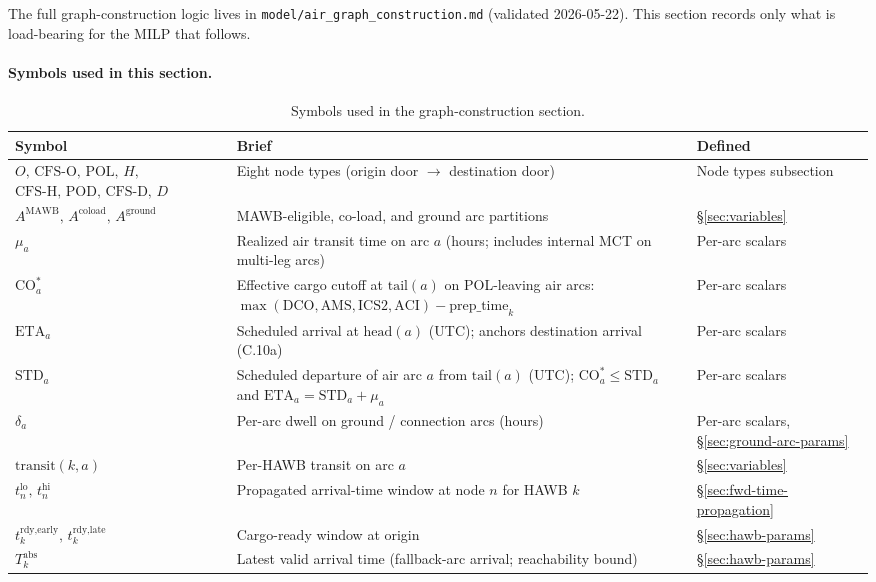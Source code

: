 \documentclass[11pt,a4paper]{article}
\theoremstyle{definition}
\begin{document}
The full graph-construction logic lives in
\texttt{model/air\_graph\_construction.md} (validated 2026-05-22). This section
records only what is load-bearing for the MILP that follows.

\paragraph{Symbols used in this section.}
\begin{table}[H]
\centering
\caption{Symbols used in the graph-construction section.}
\label{tab:graph-construction-syms}
\begin{tabular}{p{4.2cm}p{7.5cm}p{3cm}}
\toprule
Symbol & Brief & Defined \\
\midrule
$O,\, \text{CFS-O},\, \text{POL},\, H,$ $\text{CFS-H},\, \text{POD},\, \text{CFS-D},\, D$ & Eight node types (origin door $\to$ destination door) & Node types subsection \\
$A^{\text{MAWB}},\, A^{\text{coload}},\, A^{\text{ground}}$ & MAWB-eligible, co-load, and ground arc partitions & \S\ref{sec:variables} \\
$\mu_a$ & Realized air transit time on arc $a$ (hours; includes internal MCT on multi-leg arcs) & Per-arc scalars \\
$\text{CO}_a^*$ & Effective cargo cutoff at $\text{tail}(a)$ on POL-leaving air arcs: $\max(\text{DCO}, \text{AMS}, \text{ICS2}, \text{ACI}) - \text{prep\_time}_k$ & Per-arc scalars \\
$\text{ETA}_a$ & Scheduled arrival at $\text{head}(a)$ (UTC); anchors destination arrival (C.10a) & Per-arc scalars \\
$\text{STD}_a$ & Scheduled departure of air arc $a$ from $\text{tail}(a)$ (UTC); $\text{CO}_a^* \leq \text{STD}_a$ and $\text{ETA}_a = \text{STD}_a + \mu_a$ & Per-arc scalars \\
$\delta_a$ & Per-arc dwell on ground / connection arcs (hours) & Per-arc scalars, \S\ref{sec:ground-arc-params} \\
$\text{transit}(k, a)$ & Per-HAWB transit on arc $a$ & \S\ref{sec:variables} \\
$t^{\text{lo}}_n,\, t^{\text{hi}}_n$ & Propagated arrival-time window at node $n$ for HAWB $k$ & \S\ref{sec:fwd-time-propagation} \\
$t_k^{\text{rdy,early}},\, t_k^{\text{rdy,late}}$ & Cargo-ready window at origin & \S\ref{sec:hawb-params} \\
$T_k^{\text{abs}}$ & Latest valid arrival time (fallback-arc arrival; reachability bound) & \S\ref{sec:hawb-params} \\

\end{tabular}
\end{table}
\end{document}
